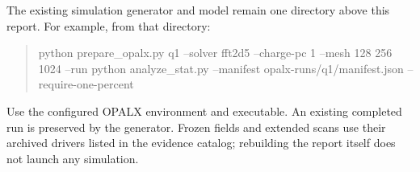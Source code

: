 \documentclass[10pt,a4paper]{article}
\begin{document}
The existing simulation generator and model remain one directory above this
report. For example, from that directory:
\begin{quote}\small\ttfamily\raggedright
python prepare\_opalx.py q1 --solver fft2d5 --charge-pc 1\newline
\hspace*{1em}--mesh 128 256 1024 --run\newline
python analyze\_stat.py --manifest opalx-runs/q1/manifest.json\newline
\hspace*{1em}--require-one-percent
\end{quote}
Use the configured OPALX environment and executable. An existing completed run
is preserved by the generator. Frozen fields and extended scans use their
archived drivers listed in the evidence catalog; rebuilding the report itself
does not launch any simulation.

\clearpage
\end{document}
